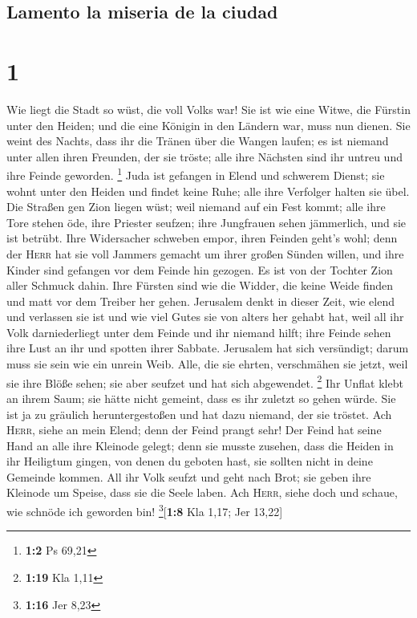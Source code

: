 \hypertarget{lamento-la-miseria-de-la-ciudad}{%
\subsection{Lamento la miseria de la
ciudad}\label{lamento-la-miseria-de-la-ciudad}}

\hypertarget{section}{%
\section{1}\label{section}}

 Wie liegt die Stadt so wüst, die voll Volks war! Sie ist
wie eine Witwe, die Fürstin unter den Heiden; und die eine Königin in
den Ländern war, muss nun dienen.  Sie weint des Nachts,
dass ihr die Tränen über die Wangen laufen; es ist niemand unter allen
ihren Freunden, der sie tröste; alle ihre Nächsten sind ihr untreu und
ihre Feinde geworden. \footnote{\textbf{1:2} Ps 69,21} 
Juda ist gefangen in Elend und schwerem Dienst; sie wohnt unter den
Heiden und findet keine Ruhe; alle ihre Verfolger halten sie übel.
 Die Straßen gen Zion liegen wüst; weil niemand auf ein
Fest kommt; alle ihre Tore stehen öde, ihre Priester seufzen; ihre
Jungfrauen sehen jämmerlich, und sie ist betrübt.  Ihre
Widersacher schweben empor, ihren Feinden geht's wohl; denn der
\textsc{Herr} hat sie voll Jammers gemacht um ihrer großen Sünden
willen, und ihre Kinder sind gefangen vor dem Feinde hin gezogen.
 Es ist von der Tochter Zion aller Schmuck dahin. Ihre
Fürsten sind wie die Widder, die keine Weide finden und matt vor dem
Treiber her gehen.  Jerusalem denkt in dieser Zeit, wie
elend und verlassen sie ist und wie viel Gutes sie von alters her gehabt
hat, weil all ihr Volk darniederliegt unter dem Feinde und ihr niemand
hilft; ihre Feinde sehen ihre Lust an ihr und spotten ihrer Sabbate.
 Jerusalem hat sich versündigt; darum muss sie sein wie
ein unrein Weib. Alle, die sie ehrten, verschmähen sie jetzt, weil sie
ihre Blöße sehen; sie aber seufzet und hat sich abgewendet. \footnote{\textbf{1:19}
  Kla 1,11}  Ihr Unflat klebt an ihrem Saum; sie hätte
nicht gemeint, dass es ihr zuletzt so gehen würde. Sie ist ja zu
gräulich heruntergestoßen und hat dazu niemand, der sie tröstet. Ach
\textsc{Herr}, siehe an mein Elend; denn der Feind prangt sehr!
 Der Feind hat seine Hand an alle ihre Kleinode gelegt;
denn sie musste zusehen, dass die Heiden in ihr Heiligtum gingen, von
denen du geboten hast, sie sollten nicht in deine Gemeinde kommen.
 All ihr Volk seufzt und geht nach Brot; sie geben ihre
Kleinode um Speise, dass sie die Seele laben. Ach \textsc{Herr}, siehe
doch und schaue, wie schnöde ich geworden bin!
\footnote{\textbf{1:16} Jer 8,23}{[}\textbf{1:8} Kla 1,17; Jer 13,22{]}

